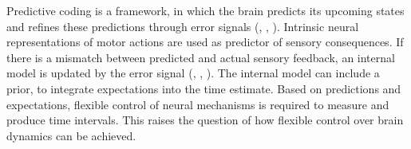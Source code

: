 \documentclass[10pt, a4paper]{article}
\begin{document}
Predictive coding is a framework, in which the brain predicts its upcoming states and refines these predictions through error signals (\cite{Rao1999}, \cite{Huang2011}, \cite{Ficco2021}).
Intrinsic neural representations of motor actions are used as predictor of sensory consequences. %
If there is a mismatch between predicted and actual sensory feedback, an internal model is updated by the error signal (\cite{Bubic2010}, \cite{Clark2013}, \cite{Straka2018}). %
The internal model can include a prior, to integrate expectations into the time estimate.
Based on predictions and expectations, flexible control of neural mechanisms is required to measure and produce time intervals.
This raises the question of how flexible control over brain dynamics can be achieved.

\end{document}
